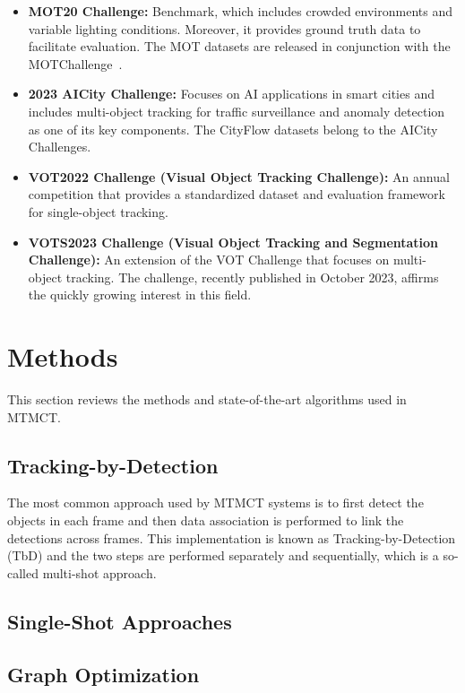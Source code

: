 \begin{itemize}
    \item \textbf{MOT20 Challenge:} Benchmark, which includes crowded environments and variable lighting conditions. Moreover, it provides ground truth data to facilitate evaluation. The MOT datasets are released in conjunction with the MOTChallenge~\cite{Dendorfer20}.
    \item \textbf{2023 AICity Challenge:} Focuses on AI applications in smart cities and includes multi-object tracking for traffic surveillance and anomaly detection as one of its key components. The CityFlow datasets belong to the AICity Challenges.~\cite{Naphade23}
    \item \textbf{VOT2022 Challenge (Visual Object Tracking Challenge):} An annual competition that provides a standardized dataset and evaluation framework for single-object tracking.~\cite{Kristan22}
    \item \textbf{VOTS2023 Challenge (Visual Object Tracking and Segmentation Challenge):} An extension of the VOT Challenge that focuses on multi-object tracking. The challenge, recently published in October 2023, affirms the quickly growing interest in this field.~\cite{Kristan23}
\end{itemize}

\section{Methods}\label{sec:methods}
This section reviews the methods and state-of-the-art algorithms used in MTMCT.

\subsection{Tracking-by-Detection}\label{subsec:tracking_by_detection}
The most common approach used by MTMCT systems is to first detect the objects in each frame and then data association is performed to link the detections across frames. This implementation is known as Tracking-by-Detection (TbD) and the two steps are performed separately and sequentially, which is a so-called multi-shot approach.

\subsection{Single-Shot Approaches}\label{subsec:single-shot_approaches}


\subsection{Graph Optimization}\label{subsec:graph_optimization}


